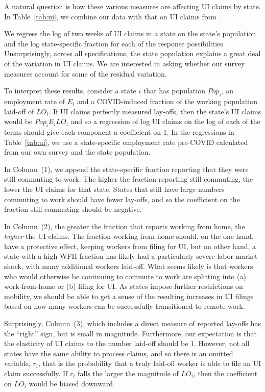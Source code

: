 \documentclass[12pt]{article}
\begin{document}
A natural question is how these various measures are affecting UI claims by state. 
In Table~\ref{tab:ui}, we combine our data with that on UI claims from \cite{goldsmith2020}.

We regress the log of two weeks of UI claims in a state on the state's population and the log state-specific fraction for each of the response possibilities.  
Unsurprisingly, across all specifications, the state population explains a great deal of the variation in UI claims.
We are interested in asking whether our survey measures account for some of the residual variation.

To interpret these results, consider a state $i$ that has population $Pop_i$, an employment rate of $E_i$ and a COVID-induced fraction of the working population laid-off of $LO_i$. If UI claims perfectly measured lay-offs, then the state's UI claims would be $Pop_i E_i LO_i$ and so a regression of log UI claims on the log of each of the terms should give each component a coefficient on $1$. 
In the regressions in Table~\ref{tab:ui}, we use a state-specific employment rate pre-COVID calculated from our own survey and the state population. 



In Column~(1), we append the state-specific fraction reporting that they were still commuting to work.
The higher the fraction reporting still commuting, the lower the UI claims for that state.
States that still have large numbers commuting to work should have fewer lay-offs, and so the coefficient on the fraction still commuting should be negative.

In Column~(2), the greater the fraction that reports working from home, the \emph{higher} the UI claims.
 The fraction working from home should, on the one hand, have a protective effect, keeping workers from filing for UI, but on other hand, a state with a high WFH fraction has likely had a particularly severe labor market shock, with many additional workers laid-off. 
What seems likely is that workers who would otherwise be continuing to commute to work are splitting into (a) work-from-home or (b) filing for UI.
As states impose further restrictions on mobility, we should be able to get a sense of the resulting increases in UI filings based on how many workers can be successfully transitioned to remote work. 

Surprisingly, Column~(3), which includes a direct measure of reported lay-offs has the ``right'' sign, but is small in magnitude.
Furthermore, our expectation is that the elasticity of UI claims to the number laid-off should be 1. 
However, not all states have the same ability to process claims, and so there is an omitted variable, $r_i$, that is the probability that a truly laid-off worker is able to file an UI claim successfully. If $r_i$ falls the larger the magnitude of $LO_i$, then the coefficient on $LO_i$ would be biased downward. 
\end{document}
